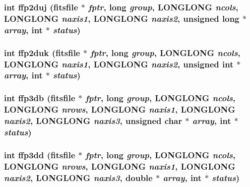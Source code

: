 \subsubsection{\setlength{\rightskip}{0pt plus 5cm}int ffp2duj (\bf{fitsfile} $\ast$ {\em fptr}, long {\em group}, \bf{LONGLONG} {\em ncols}, \bf{LONGLONG} {\em naxis1}, \bf{LONGLONG} {\em naxis2}, unsigned long $\ast$ {\em array}, int $\ast$ {\em status})}\label{src_2fitsio_8h_894a5478ff80f7822a394abc4cac5db3}


\subsubsection{\setlength{\rightskip}{0pt plus 5cm}int ffp2duk (\bf{fitsfile} $\ast$ {\em fptr}, long {\em group}, \bf{LONGLONG} {\em ncols}, \bf{LONGLONG} {\em naxis1}, \bf{LONGLONG} {\em naxis2}, unsigned int $\ast$ {\em array}, int $\ast$ {\em status})}\label{src_2fitsio_8h_7daa3c68214e4bf5e9510489d23c8344}


\subsubsection{\setlength{\rightskip}{0pt plus 5cm}int ffp3db (\bf{fitsfile} $\ast$ {\em fptr}, long {\em group}, \bf{LONGLONG} {\em ncols}, \bf{LONGLONG} {\em nrows}, \bf{LONGLONG} {\em naxis1}, \bf{LONGLONG} {\em naxis2}, \bf{LONGLONG} {\em naxis3}, unsigned char $\ast$ {\em array}, int $\ast$ {\em status})}\label{src_2fitsio_8h_509db23e215c4ac2df334edd78851e1e}


\subsubsection{\setlength{\rightskip}{0pt plus 5cm}int ffp3dd (\bf{fitsfile} $\ast$ {\em fptr}, long {\em group}, \bf{LONGLONG} {\em ncols}, \bf{LONGLONG} {\em nrows}, \bf{LONGLONG} {\em naxis1}, \bf{LONGLONG} {\em naxis2}, \bf{LONGLONG} {\em naxis3}, double $\ast$ {\em array}, int $\ast$ {\em status})}\label{src_2fitsio_8h_07253c7bb04c4b09022517aff697976b}



